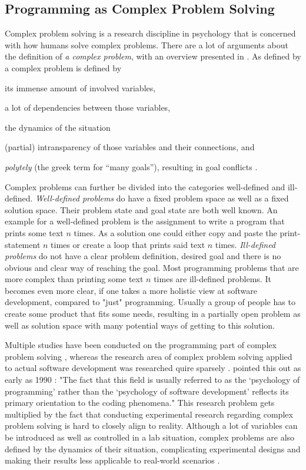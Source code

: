 \subsection{Programming as Complex Problem Solving}
Complex problem solving is a research discipline in psychology that is concerned with how humans solve complex problems.
There are a lot of arguments about the definition of \emph{a complex problem}, with an overview presented in \cite{dorner_complex_2017}.
As defined by \citeauthor{funke_complex_2012} a complex problem is defined by
\begin{enumerate*}[label=(\roman*)]
\item its immense amount of involved variables,
\item a lot of dependencies between those variables,
\item the dynamics of the situation
\item (partial) intransparency of those variables and their connections, and
\item \emph{polytely} (the greek term for “many goals”), resulting in goal conflicts \cite{funke_complex_2012}.
\end{enumerate*}
Complex problems can further be divided into the categories well-defined and ill-defined.
\emph{Well-defined problems} do have a fixed problem space as well as a fixed solution space.
Their problem state and goal state are both well known.
An example for a well-defined problem is the assignment to write a program that prints some text $n$ times.
As a solution one could either copy and paste the print-statement $n$ times or create a loop that prints said text $n$ times.
\emph{Ill-defined problems} do not have a clear problem definition, desired goal and there is no obvious and clear way of reaching the goal.
Most programming problems that are more complex than printing some text $n$ times are ill-defined problems.
It becomes even more clear, if one takes a more holistic view at software development, compared to "just" programming.
Usually a group of people has to create some product that fits some needs, resulting in a partially open problem as well as solution space with many potential ways of getting to this solution.

Multiple studies have been conducted on the programming part of complex problem solving \cite{lawan_what_2019, gibson_software_2005, robertson_role_2008, taheri_evaluating_2015}, whereas the research area of complex problem solving applied to actual software development was researched quire sparsely \cite{wingo_using_2015}.
\citeauthor{curtis_psychology_1990} pointed this out as early as 1990 \cite{curtis_psychology_1990}: "The fact that this field is usually referred to as the `psychology of programming' rather than the `psychology of software development' reflects its primary orientation to the coding phenomena."
This research problem gets multiplied by the fact that conducting experimental research regarding complex problem solving is hard to closely align to reality.
Although a lot of variables can be introduced as well as controlled in a lab situation, complex problems are also defined by the dynamics of their situation, complicating experimental designs and making their results less applicable to real-world scenarios \cite{lawan_what_2019}.



